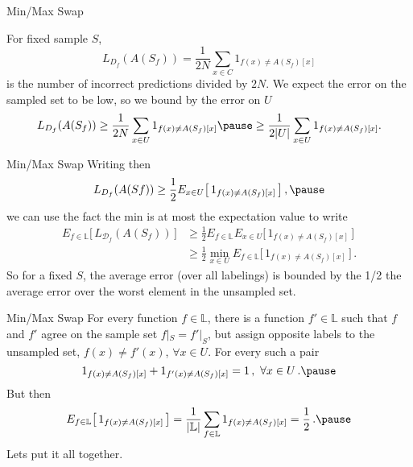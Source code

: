 \documentclass[10pt, table, dvipsnames,handout]{beamer}
\newcommand{\cD}{\ensuremath{\mathcal{D}}}
\newcommand{\bL}{\ensuremath{\mathbb{L}}}
\begin{document}
\begin{frame}[fragile]{Min/Max Swap}
\begin{minipage}[t][0.4\textheight][t]{\textwidth}
  \end{minipage}
  \vfill
  \begin{minipage}[t][0.6\textheight][t]{\textwidth}
For fixed sample $S$, 
$$
L_{D_f}(A(S_f)) = \frac{1}{2N} \sum_{x\in C} 1_{f(x)\neq A(S_f)[x]}
$$
is the number of incorrect predictions divided by $2N$. \pause \pause We expect the error on the sampled set to be low, so we bound by the error on $U$
$$
L_{D_f}(A(S_f)) \geq \frac{1}{2N} \sum_{x\in U} 1_{f(x)\neq A(S_f)[x]}\pause \geq \frac{1}{2|U|} \sum_{x\in U} 1_{f(x)\neq A(S_f)[x]}.
$$

\end{minipage}
\end{frame}






\begin{frame}[fragile]{Min/Max Swap}
Writing then
$$
L_{D_f}(A(Sf)) \geq \frac{1}{2}E_{x\in U}\big[\,  1_{f(x)\neq A(S_f)[x]} \,\big]\,,\pause
$$
we can use the fact the min is at most the expectation value to write
\begin{align*}
 E_{f\in \bL}\big[\,  L_{\cD_f}(A(S_f))\,\big] &\geq  \frac12 E_{f\in \bL} E_{x\in U}\big[\,  1_{f(x)\neq A(S_f)[x]} \,\big]
\\
&\geq  \frac12 \min_{x\in U} E_{f\in \bL}\big[\,  1_{f(x)\neq A(S_f)[x]} \,\big]\,.
\end{align*}\pause
So for a fixed $S$, the average error (over all labelings) is bounded by the 1/2 the average error over the worst element in the unsampled set. 

\end{frame}



\begin{frame}[fragile]{Min/Max Swap}
For every function $f\in \mathbb{L}$, there is a function $f'\in \mathbb{L}$ such that $f$ and $f'$ agree on the sample set $f|_S = f'|_S$, but assign opposite labels to the unsampled set, $f(x)\neq f'(x)$, $\forall x\in U$. \pause For every such a pair
$$
1_{f(x)\neq A(S_f)[x]} + 1_{f'(x)\neq A(S_f)[x]} = 1\,,\,\,\forall x\in U\,.\pause
$$
But then 
$$
E_{f\in \bL}\big[\,  1_{f(x)\neq A(S_f)[x]} \,\big] = \frac{1}{|\mathbb{L}|}\sum_{f\in\mathbb{L}} 1_{f(x)\neq A(S_f)[x]}  = \frac{1}{2}\,.\pause
$$
Lets put it all together.
\end{frame}
\end{document}
